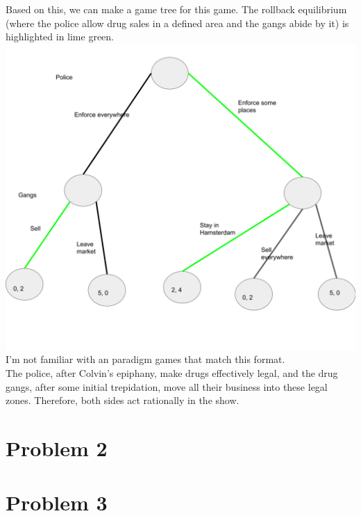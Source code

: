 \documentclass[letterpaper]{article}
\begin{document}
Based on this, we can make a game tree for this game. The rollback equilibrium (where the police allow drug sales in a defined area and the gangs abide by it) is highlighted in lime green. \\
\hspace*{-5in}\includegraphics[scale=0.7]{fig1} \\
I'm not familiar with an paradigm games that match this format. \\
The police, after Colvin's epiphany, make drugs effectively legal, and the drug gangs, after some initial trepidation, move all their business into these legal zones. Therefore, both sides act rationally in the show.
\section{Problem 2}
\section{Problem 3}
\end{document}
